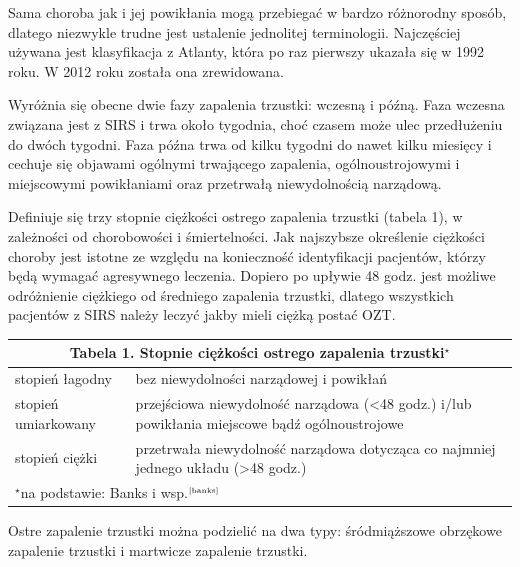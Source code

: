 \documentclass[a4paper, 12pt]{report}
\newcommand\cyt[1]{$^{\tiny{\cite{#1}}}$}
\begin{document}
Sama choroba jak i jej powikłania mogą przebiegać w bardzo różnorodny
sposób, dlatego niezwykle trudne jest ustalenie jednolitej
terminologii. Najczęściej używana jest klasyfikacja z Atlanty, która
po raz pierwszy ukazała się w 1992 roku. W 2012 roku została ona
zrewidowana.

Wyróżnia się obecne dwie fazy zapalenia trzustki: wczesną i
późną. Faza wczesna związana jest z SIRS i trwa około tygodnia, choć
czasem może ulec przedłużeniu do dwóch tygodni. Faza późna trwa od
kilku tygodni do nawet kilku miesięcy i cechuje się objawami ogólnymi
trwającego zapalenia, ogólnoustrojowymi i miejscowymi powikłaniami
oraz przetrwałą niewydolnością narządową.

Definiuje się trzy stopnie ciężkości ostrego zapalenia
trzustki (tabela 1),  w zależności od chorobowości i śmiertelności. Jak
najszybsze określenie ciężkości choroby jest istotne ze względu na
konieczność identyfikacji pacjentów, którzy będą wymagać agresywnego
leczenia. Dopiero po upływie 48 godz. jest możliwe odróżnienie
ciężkiego od średniego zapalenia trzustki, dlatego wszystkich
pacjentów z SIRS należy leczyć jakby mieli ciężką postać OZT.
\begin{table}[htbp]
\begin{center}
\begin{footnotesize}
\begin{tabular}{|p{4cm}|p{9cm}|}
  \hline
  \multicolumn{2}{|c|}{\cellcolor[gray]{0.9} \textbf{Tabela 1. Stopnie ciężkości ostrego zapalenia trzustki$^\star$}}\\
  \hline \hline
  stopień łagodny & bez niewydolności narządowej i powikłań\\ \hline
  stopień umiarkowany & przejściowa niewydolność narządowa (<48
                        godz.) i/lub powikłania miejscowe bądź
                        ogólnoustrojowe\\ \hline
  stopień ciężki & przetrwała niewydolność narządowa dotycząca
                   co najmniej jednego układu (>48 godz.)\\ \hline
  \multicolumn{2}{|l|}{\scriptsize{$^\star$na podstawie: Banks i wsp.\cyt{banks}}}\\
  \hline
\end{tabular}
\end{footnotesize}
\end{center}
\end{table}

Ostre zapalenie trzustki można podzielić na dwa typy: śródmiąższowe
obrzękowe zapalenie trzustki i martwicze zapalenie trzustki. 
\end{document}
